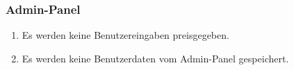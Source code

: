 \subsubsection{Admin-Panel}

\begin{enumerate}
    \item Es werden keine Benutzereingaben preisgegeben.
    \item Es werden keine Benutzerdaten vom Admin-Panel gespeichert.
\end{enumerate}